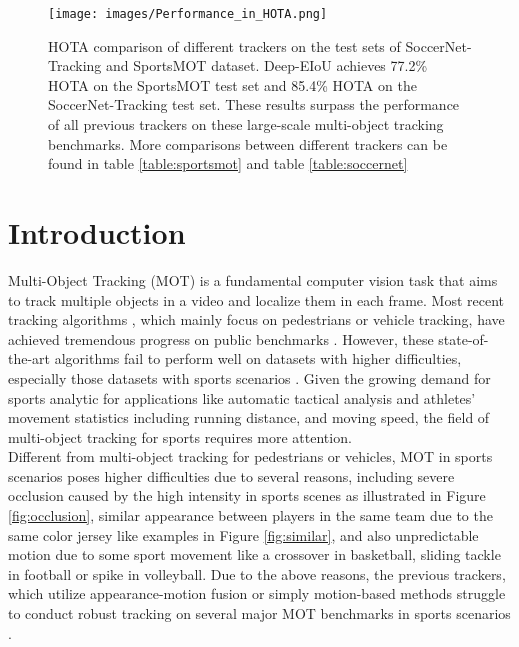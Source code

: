 \documentclass[10pt,twocolumn,letterpaper]{article}
\begin{document}
\begin{figure}[t]
  \centering
  \texttt{[image: images/Performance\_in\_HOTA.png]}
  \caption{HOTA comparison of different trackers on the test sets of SoccerNet-Tracking and SportsMOT dataset. Deep-EIoU achieves 77.2\% HOTA on the SportsMOT test set and 85.4\% HOTA on the SoccerNet-Tracking test set. These results surpass the performance of all previous trackers on these large-scale multi-object tracking benchmarks. More comparisons between different trackers can be found in table \ref{table:sportsmot} and table \ref{table:soccernet}} 
  \label{fig:hota-two-dataset}
\end{figure}





\section{Introduction}
Multi-Object Tracking (MOT) is a fundamental computer vision task that aims to track multiple objects in a video and localize them in each frame. Most recent tracking algorithms \cite{ByteTrack, aharon2022bot, DeepSORT, SORT}, which mainly focus on pedestrians or vehicle tracking, have achieved tremendous progress on public benchmarks \cite{mot16,dendorfer2020mot20,geiger2013vision}. However, these state-of-the-art algorithms fail to perform well on datasets with higher difficulties, especially those datasets with sports scenarios \cite{cui2023sportsmot,cioppa2022soccernet,zhao2023survey}. Given the growing demand for sports analytic for applications like automatic tactical analysis and athletes' movement statistics including running distance, and moving speed, the field of multi-object tracking for sports requires more attention.\\

Different from multi-object tracking for pedestrians or vehicles, MOT in sports scenarios poses higher difficulties due to several reasons, including severe occlusion caused by the high intensity in sports scenes as illustrated in Figure \ref{fig:occlusion}, similar appearance between players in the same team due to the same color jersey like examples in Figure \ref{fig:similar}, and also unpredictable motion due to some sport movement like a crossover in basketball, sliding tackle in football or spike in volleyball. Due to the above reasons, the previous trackers, which utilize appearance-motion fusion \cite{FairMOT,DeepSORT} or simply motion-based \cite{ByteTrack,OCSORT,SORT} methods struggle to conduct robust tracking on several major MOT benchmarks in sports scenarios \cite{cioppa2022soccernet,cui2023sportsmot}.
\end{document}
